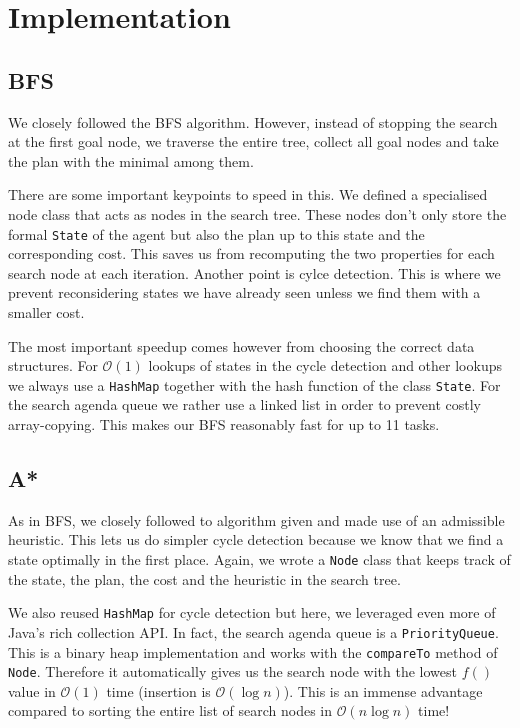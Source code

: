 \documentclass[11pt]{article}
\begin{document}
\section{Implementation}

\subsection{BFS}
We closely followed the BFS algorithm. However, instead of stopping the 
search at the first goal node, we traverse the entire tree, collect all goal nodes and take the plan 
with the minimal among them.

There are some important keypoints to speed in this. 
We defined a specialised node class that acts as nodes in 
the search tree. These nodes don't only store the formal \texttt{State} of the 
agent but also the plan up to this state and the corresponding cost. This 
saves us from recomputing the two properties for each search node at each iteration. 
Another point is cylce detection. This is where we prevent reconsidering 
states we have already seen unless we find them with a smaller cost.

The most important speedup comes however from choosing the correct data structures.
For $\mathcal{O}(1)$ lookups of states in the cycle detection and other lookups we 
always use a \texttt{HashMap} together with the hash function of the class 
\texttt{State}.
For the search agenda queue we rather use a linked list in order to prevent costly 
array-copying. This makes our BFS reasonably fast for up to 11 tasks.

\subsection{A*}
As in BFS, we closely followed to algorithm given and made use of an admissible 
heuristic. This lets us do simpler cycle detection because we know that we find a 
state optimally in the first place. Again, we wrote a \texttt{Node} 
class that keeps track of the state, the plan, the cost and the heuristic in the 
search tree.

We also reused \texttt{HashMap} for cycle detection but here,
 we leveraged even more of Java's rich collection API. In fact, the search 
agenda queue is a \texttt{PriorityQueue}. This is a binary heap implementation 
and works with the \texttt{compareTo} method of \texttt{Node}. Therefore it automatically 
gives us the search node with the lowest $f()$ value in $\mathcal{O}(1)$ 
time (insertion is $\mathcal{O}(\log n)$). This is an immense advantage 
compared to sorting the entire 
list of search nodes in $\mathcal{O}(n \log n)$ time!
\end{document}
